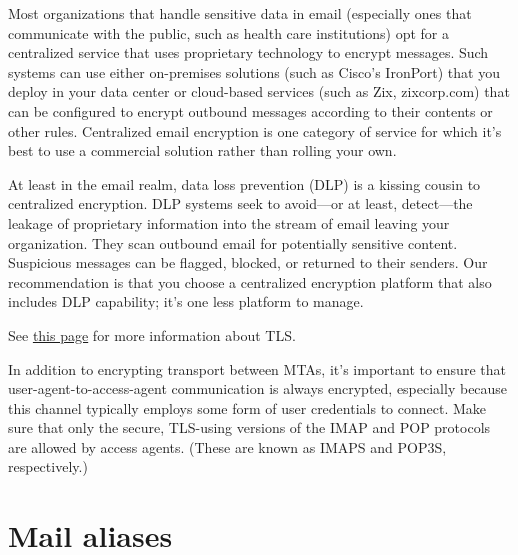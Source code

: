 \protect\hypertarget{part0026_split_017.htmlux5cux23_idTextAnchor1028}{}{}Most
organizations that handle sensitive data in email (especially ones that
communicate with the public, such as health care institutions) opt for a
centralized service that uses proprietary technology to encrypt
messages. Such systems can use either on-premises solutions (such as
\protect\hypertarget{part0026_split_017.htmlux5cux23_idIndexMarker2459}{}{}Cisco's
IronPort) that you deploy in your data center or cloud-based services
(such as
\protect\hypertarget{part0026_split_017.htmlux5cux23_idIndexMarker2460}{}{}Zix,
zixcorp.com) that can be configured to encrypt outbound messages
according to their contents or other rules. Centralized email encryption
is one category of service for which it's best to use a commercial
solution rather than rolling your own.

At least in the email realm,
\protect\hypertarget{part0026_split_017.htmlux5cux23_idIndexMarker2461}{}{}\protect\hypertarget{part0026_split_017.htmlux5cux23_idIndexMarker2462}{}{}\protect\hypertarget{part0026_split_017.htmlux5cux23_idIndexMarker2463}{}{}data
loss prevention (DLP) is a kissing cousin to centralized encryption. DLP
systems seek to avoid---or at least, detect---the leakage of proprietary
information into the stream of email leaving your organization. They
scan outbound email for potentially sensitive content. Suspicious
messages can be flagged, blocked, or returned to their senders. Our
recommendation is that you choose a centralized encryption platform that
also includes DLP capability; it's one less platform to manage.

\leavevmode\hypertarget{part0026_split_017.htmlux5cux23_idContainer1110}{}%
See
\protect\hyperlink{part0037_split_040.htmlux5cux23_idTextAnchor1727}{this
page} for more information about TLS.

In addition to encrypting transport between MTAs, it's important to
ensure that user-agent-to-access-agent communication is always
encrypted, especially because this channel typically employs some form
of user credentials to connect. Make sure that only the secure,
TLS-using versions of the IMAP and POP protocols are allowed by access
agents. (These are known as
\protect\hypertarget{part0026_split_017.htmlux5cux23_idIndexMarker2464}{}{}IMAPS
and
\protect\hypertarget{part0026_split_017.htmlux5cux23_idIndexMarker2465}{}{}POP3S,
respectively.)


\section{Mail aliases}

